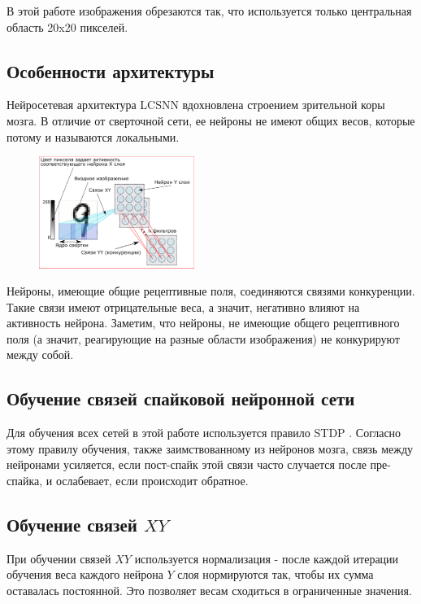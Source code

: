 \documentclass[a4paper]{article}
\begin{document}
В этой работе изображения обрезаются так, что используется только центральная область 20x20 пикселей.\\

\subsection{Особенности архитектуры}
Нейросетевая архитектура LCSNN \cite{saunders2019locally} вдохновлена строением зрительной коры мозга. В отличие от сверточной сети, ее нейроны не имеют общих весов, которые потому и называются локальными.

\begin{figure} \label{LCSNN} 
 \centering
 \includegraphics[width=0.45\textwidth]{LCSNN.pdf}
\end{figure}

Нейроны, имеющие общие рецептивные поля, соединяются связями конкуренции. Такие связи имеют отрицательные веса, а значит, негативно влияют на активность нейрона. Заметим, что нейроны, не имеющие общего рецептивного поля (а значит, реагирующие на разные области изображения) не конкурируют между собой.

\subsection{Обучение связей спайковой нейронной сети}

Для обучения всех сетей в этой работе используется правило STDP \cite{STDP}. Согласно этому правилу обучения, также заимствованному из нейронов мозга, связь между нейронами усиляется, если пост-спайк этой связи часто случается после пре-спайка, и ослабевает, если происходит обратное.

\subsection{Обучение связей $XY$}
При обучении связей $XY$ используется нормализация - после каждой итерации обучения веса каждого нейрона $Y$ слоя нормируются так, чтобы их сумма оставалась постоянной. Это позволяет весам сходиться в ограниченные значения. 
\end{document}
